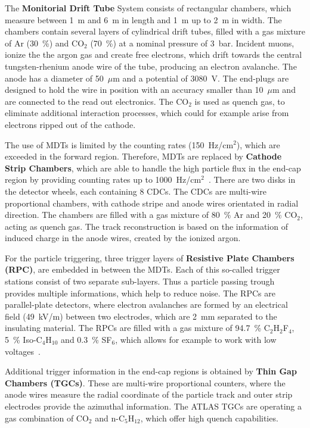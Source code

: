  The \textbf{Monitorial Drift Tube} System consists of rectangular  chambers, which measure between 1~m and 6~m in length and 1~m up to 2~m in width. The chambers contain several layers of cylindrical drift tubes, filled with a gas mixture of Ar (30~\%) and CO$_2$ (70~\%) at a nominal  pressure of 3~bar. Incident muons, ionize the the argon gas and create free electrons, which drift towards the central tungsten-rhenium anode wire of the tube, producing an electron avalanche.  The anode has a diameter of 50~$\mu$m and a potential of 3080~V. The end-plugs are designed to hold the wire in position with an accuracy smaller than 10~$\mu$m and are connected to the read out electronics. The CO$_2$ is used as quench gas, to eliminate additional interaction processes, which could for example arise from electrons ripped out of the cathode. 

 The use of MDTs is limited by the counting rates (150~Hz/cm$^2$), which are exceeded in the forward region. Therefore, MDTs are replaced by \textbf{Cathode Strip Chambers}, which are able to handle the high particle flux in the end-cap region by providing counting rates up to 1000~Hz/cm$^2$~\cite{ATLAS:1999uwa}. There are two disks in the detector wheels, each containing 8 CDCs. The CDCs are multi-wire proportional chambers, with cathode stripe  and anode wires orientated in radial direction. The chambers are filled with a gas mixture of  80~\% Ar and 20~\% CO$_2$, acting as quench gas. The track reconstruction is based on the information of induced charge in the anode wires, created by the ionized argon.

 For the particle triggering, three trigger layers of \textbf{Resistive Plate Chambers (RPC)}, are embedded  in between the MDTs. Each of this so-called trigger stations consist of two separate sub-layers. Thus a particle passing trough provides multiple informations, which help to reduce noise.  The RPCs are parallel-plate detectors, where electron avalanches are formed by an electrical field (49~kV/m) between two electrodes, which are  2~mm separated to the insulating material. The RPCs are filled with a gas mixture of 94.7~\%   C$_2$H$_2$F$_4$, 5~\% Iso-C$_4$H$_{10}$ and 0.3~\% SF$_6$, which allows for example to work with  low voltages~\cite{ATLAS:1999uwa}. 

Additional trigger information in the end-cap regions is obtained by \textbf{Thin Gap Chambers (TGCs)}. These are multi-wire proportional counters, where the anode wires 
measure the radial coordinate of the particle track and outer strip electrodes provide the azimuthal information. The ATLAS TGCs are operating a gas combination of CO$_2$ and n-C$_5$H$_{12}$, which offer high quench capabilities.


